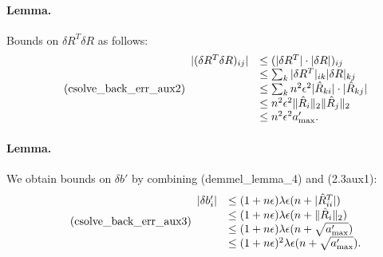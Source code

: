 \documentclass[a4paper]{article}
\begin{document}
\paragraph{Lemma.} Bounds on $\delta R^T \delta R$ as follows:
\begin{equation}\tag{csolve\_back\_err\_aux2}
  \begin{array}{rl}
    |(\delta R ^T \delta R)_{ij}| & \le (|\delta R^T| \cdot |\delta R|)_{ij} \\
    & \le \sum_k |\delta R^T|_{ik} |\delta R|_{kj} \\
    & \le \sum_k n^2\epsilon^2 |\hat{R}_{ki}|\cdot|\hat{R}_{kj}| \\
    & \le n^2\epsilon^2 \lVert \hat{R}_i \rVert_2 \lVert \hat{R}_j \rVert_2 \\
    & \le n^2\epsilon^2 a'_\mathrm{max}.
  \end{array}
\end{equation}

\paragraph*{Lemma.} We obtain bounds on $\delta b'$ by
combining (demmel\_lemma\_4) and (2.3aux1):
\begin{equation}\tag{csolve\_back\_err\_aux3}
\begin{array}{rl}
|\delta b'_i| & \le (1+n\epsilon)\lambda \epsilon (n + |\hat{R}^T_{ii}|) \\
& \le (1+n\epsilon)\lambda \epsilon (n + \lVert \hat{R}_i \rVert_2) \\
& \le (1+n\epsilon)\lambda \epsilon (n + \sqrt{a'_\mathrm{max}}) \\
& \le (1+n\epsilon)^2\lambda \epsilon (n + \sqrt{a'_\mathrm{max}}).
\end{array}
\end{equation}
\end{document}
